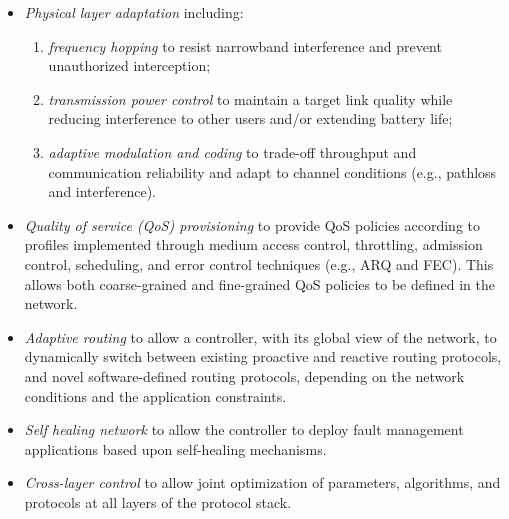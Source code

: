 \begin{itemize}
\item \emph{Physical layer adaptation} including:
\begin{enumerate}
	\item \emph{frequency hopping} to resist narrowband interference and prevent unauthorized interception; 
	\item \emph{transmission power control} to maintain a target link quality while reducing interference to other users and/or extending battery life;
	\item \emph{adaptive modulation and coding} to trade-off throughput and communication reliability and adapt to channel conditions (e.g., pathloss and interference).
\end{enumerate}


\item \emph{Quality of service (QoS) provisioning} to provide QoS policies according to profiles implemented through medium access control, throttling, admission control, scheduling, and error control techniques (e.g., ARQ and FEC). This allows both coarse-grained and fine-grained QoS policies to be defined in the network.

\item \emph{Adaptive routing} to allow a  \crossflow controller, with its global view of the network, to dynamically switch between existing proactive and reactive routing protocols, and novel software-defined routing protocols, depending on the network conditions and the application constraints.


\item \emph{Self healing network} to allow the \crossflow controller to deploy fault management applications based upon self-healing mechanisms.

\item \emph{Cross-layer control} to allow joint optimization of parameters, algorithms, and protocols at all layers of the protocol stack.
\end{itemize}

